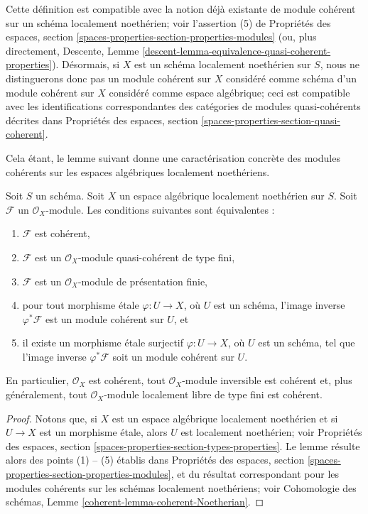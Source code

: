 \noindent
Cette définition est compatible avec la notion déjà existante de
module cohérent sur un schéma localement noethérien; voir l'assertion (5) de
Propriétés des espaces, section
\ref{spaces-properties-section-properties-modules} (ou, plus directement,
Descente, Lemme \ref{descent-lemma-equivalence-quasi-coherent-properties}).
Désormais, si $X$ est un schéma localement noethérien sur $S$,
nous ne distinguerons donc pas un module cohérent sur $X$ considéré
comme schéma d'un module cohérent sur $X$ considéré comme espace algébrique;
ceci est compatible avec les identifications correspondantes des catégories
de modules quasi-cohérents décrites dans
Propriétés des espaces, section \ref{spaces-properties-section-quasi-coherent}.

\medskip\noindent
Cela étant, le lemme suivant donne une caractérisation concrète
des modules cohérents sur les espaces algébriques localement
noethériens.

\begin{lemma}
\label{lemma-coherent-Noetherian}
Soit $S$ un schéma.
Soit $X$ un espace algébrique localement noethérien sur $S$.
Soit $\mathcal{F}$ un $\mathcal{O}_X$-module.
Les conditions suivantes sont équivalentes :
\begin{enumerate}
\item $\mathcal{F}$ est cohérent,
\item $\mathcal{F}$ est un $\mathcal{O}_X$-module quasi-cohérent de type fini,
\item $\mathcal{F}$ est un $\mathcal{O}_X$-module de présentation finie,
\item pour tout morphisme \'etale $\varphi : U \to X$, où $U$ est un schéma,
l'image inverse $\varphi^*\mathcal{F}$ est un module cohérent sur $U$, et
\item il existe un morphisme \'etale surjectif $\varphi : U \to X$,
où $U$ est un schéma, tel que l'image inverse $\varphi^*\mathcal{F}$ soit
un module cohérent sur $U$.
\end{enumerate}
En particulier, $\mathcal{O}_X$ est cohérent, tout
$\mathcal{O}_X$-module inversible est cohérent et, plus généralement, tout
$\mathcal{O}_X$-module localement libre de type fini est cohérent.
\end{lemma}

\begin{proof}
Notons que, si $X$ est un espace algébrique localement noethérien et si
$U \to X$ est un morphisme \'etale, alors $U$ est localement noethérien; voir
Propriétés des espaces, section \ref{spaces-properties-section-types-properties}.
Le lemme résulte alors des points (1) -- (5) établis dans
Propriétés des espaces, section \ref{spaces-properties-section-properties-modules},
et du résultat correspondant pour les modules cohérents sur les schémas
localement noethériens; voir
Cohomologie des schémas, Lemme \ref{coherent-lemma-coherent-Noetherian}.
\end{proof}

